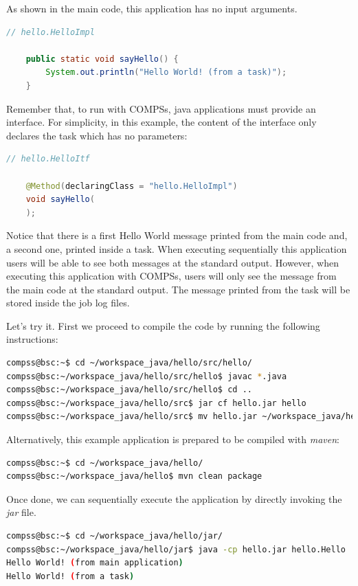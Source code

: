 As shown in the main code, this application has no input arguments. 

\begin{lstlisting}[language=java]
	// hello.HelloImpl
	
	public static void sayHello() {
		System.out.println("Hello World! (from a task)");
	}
\end{lstlisting}

Remember that, to run with COMPSs, java applications must provide an interface. For simplicity, in this example, the content of the interface only
declares the task which has no parameters:

\begin{lstlisting}[language=java]
	// hello.HelloItf
	
	@Method(declaringClass = "hello.HelloImpl")
	void sayHello(
	);
\end{lstlisting}

Notice that there is a first Hello World message printed from the main code and, a second one, printed inside a task. When executing sequentially
this application users will be able to see both messages at the standard output. However, when executing this application with COMPSs, users will only
see the message from the main code at the standard output. The message printed from the task will be stored inside the job log files. 

Let's try it. First we proceed to compile the code by running the following instructions:

\begin{lstlisting}[language=bash]
compss@bsc:~$ cd ~/workspace_java/hello/src/hello/
compss@bsc:~/workspace_java/hello/src/hello$ javac *.java
compss@bsc:~/workspace_java/hello/src/hello$ cd ..
compss@bsc:~/workspace_java/hello/src$ jar cf hello.jar hello
compss@bsc:~/workspace_java/hello/src$ mv hello.jar ~/workspace_java/hello/jar/
\end{lstlisting}

Alternatively, this example application is prepared to be compiled with \textit{maven}:

\begin{lstlisting}[language=bash]
compss@bsc:~$ cd ~/workspace_java/hello/
compss@bsc:~/workspace_java/hello$ mvn clean package
\end{lstlisting}

Once done, we can sequentially execute the application by directly invoking the \textit{jar} file.

\begin{lstlisting}[language=bash]
compss@bsc:~$ cd ~/workspace_java/hello/jar/
compss@bsc:~/workspace_java/hello/jar$ java -cp hello.jar hello.Hello 
Hello World! (from main application)
Hello World! (from a task)
\end{lstlisting}

